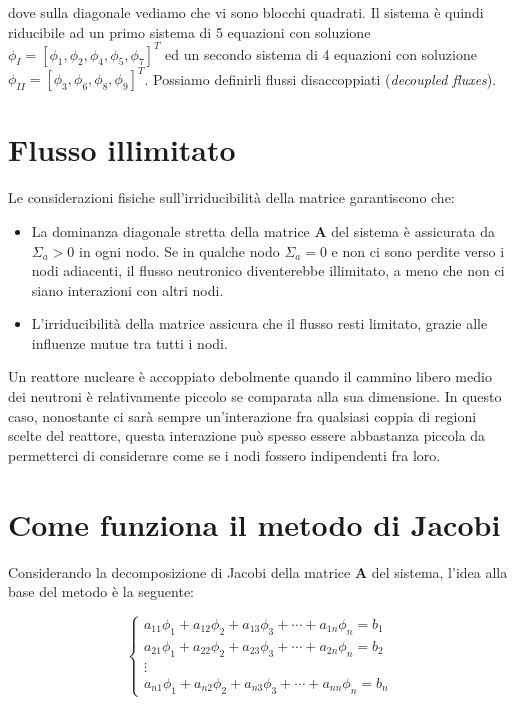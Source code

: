 dove sulla diagonale vediamo che vi sono blocchi quadrati. Il sistema è quindi riducibile ad un primo sistema di 5 equazioni con soluzione
$\phi_I = [\phi_1, \phi_2, \phi_4, \phi_5, \phi_7]^T$ ed un secondo
sistema di 4 equazioni con soluzione
$\phi_{II} = [\phi_3, \phi_6, \phi_8, \phi_9]^T$. Possiamo definirli flussi disaccoppiati (\emph{decoupled fluxes}).



%
%
%
\section{Flusso illimitato}

Le considerazioni fisiche sull'irriducibilità della matrice garantiscono che:

\begin{itemize}
	\item La dominanza diagonale stretta della matrice $\mathbf{A}$ del sistema è assicurata da $\Sigma_a > 0$ in ogni nodo. Se in qualche nodo $\Sigma_a = 0$ e non ci sono perdite verso i nodi adiacenti, il flusso neutronico diventerebbe illimitato, a meno che non ci siano interazioni con altri nodi.
	\item L’irriducibilità della matrice assicura che il flusso resti limitato, grazie alle influenze mutue tra tutti i nodi.
\end{itemize}

Un reattore nucleare è accoppiato debolmente quando il cammino libero medio dei neutroni è relativamente piccolo se comparata alla sua dimensione.
In questo caso, nonostante ci sarà sempre un'interazione fra qualsiasi coppia di regioni scelte del reattore, questa interazione può spesso essere abbastanza piccola da permetterci di considerare come se i nodi fossero indipendenti fra loro.


\section{Come funziona il metodo di Jacobi}

Considerando la decomposizione di Jacobi della matrice \(\mathbf{A}\) del sistema, l'idea alla base del metodo è la seguente:

\begin{equation*}
	\begin{cases}
		a_{11} \phi_1 + a_{12} \phi_2 + a_{13} \phi_3 + \cdots + a_{1n} \phi_n = b_1 \\
		a_{21} \phi_1 + a_{22} \phi_2 + a_{23} \phi_3 + \cdots + a_{2n} \phi_n = b_2 \\
		\vdots \\
		a_{n1} \phi_1 + a_{n2} \phi_2 + a_{n3} \phi_3 + \cdots + a_{nn} \phi_n = b_n
	\end{cases}
	\label{eq:sistema_jacobi}
\end{equation*}

